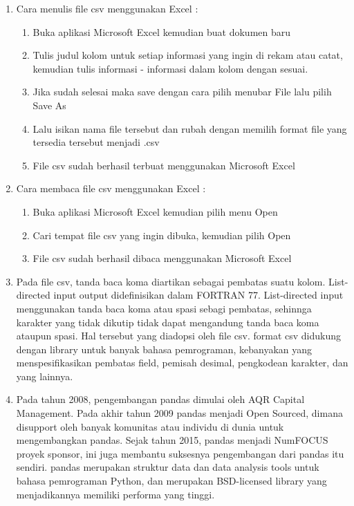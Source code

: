\begin{enumerate}
			\item Cara menulis file csv menggunakan Excel :
				\begin{enumerate}
					\item Buka aplikasi Microsoft Excel kemudian buat dokumen baru
					\item Tulis judul kolom untuk setiap informasi yang ingin di rekam atau catat, kemudian tulis informasi - informasi dalam kolom dengan sesuai.
					\item Jika sudah selesai maka save dengan cara pilih menubar File lalu pilih Save As
					\item Lalu isikan nama file tersebut dan rubah dengan memilih format file yang tersedia tersebut menjadi .csv
					\item File csv sudah berhasil terbuat menggunakan Microsoft Excel
				\end{enumerate}
			\item Cara membaca file csv menggunakan Excel :
				\begin{enumerate}
					\item Buka aplikasi Microsoft Excel kemudian pilih menu Open
					\item Cari tempat file csv yang ingin dibuka, kemudian pilih Open
					\item File csv sudah berhasil dibaca menggunakan Microsoft Excel
				\end{enumerate}
			
			\item Pada file csv, tanda baca koma diartikan sebagai pembatas suatu kolom. List-directed input output didefinisikan dalam FORTRAN 77. List-directed input menggunakan tanda baca koma atau spasi sebagi pembatas, sehinnga karakter yang tidak dikutip tidak dapat mengandung tanda baca koma ataupun spasi. Hal tersebut yang diadopsi oleh file csv. format csv didukung dengan library untuk banyak bahasa pemrograman, kebanyakan yang menspesifikasikan pembatas field, pemisah desimal, pengkodean karakter, dan yang lainnya.
			
			\item Pada tahun 2008, pengembangan pandas dimulai oleh AQR Capital Management. Pada akhir tahun 2009 pandas menjadi Open Sourced, dimana disupport oleh banyak komunitas atau individu di dunia untuk mengembangkan pandas. Sejak tahun 2015, pandas menjadi NumFOCUS proyek sponsor, ini juga membantu suksesnya pengembangan dari pandas itu sendiri. pandas merupakan struktur data dan data analysis tools untuk bahasa pemrograman Python, dan merupakan BSD-licensed library yang menjadikannya memiliki performa yang tinggi.
			

\end{enumerate}
